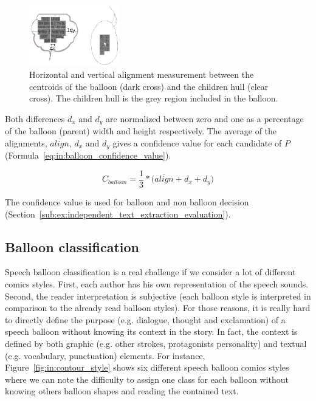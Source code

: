     \begin{figure}[ht]%
      \centering
      \includegraphics[trim= 0px 15px 80px 24px, clip, width=0.35\textwidth]{coaxial_alignment.png}
    \caption[Balloon content alignment measures]{Horizontal and vertical alignment measurement between the centroids of the balloon (dark cross) and the children hull (clear cross). The children hull is the grey region included in the balloon.}
    \label{fig:in:coaxial_alignment}
    \end{figure}

Both differences $d_x$ and $d_y$ are normalized between zero and one as a percentage of the balloon (parent) width and height respectively.
The average of the alignments, $\overline{align}$, $d_x$ and $d_y$ gives a confidence value for each candidate of $P$ (Formula~\ref{eq:in:balloon_confidence_value}).

\begin{equation}
	\label{eq:in:balloon_confidence_value}
	C_{balloon} = \frac{1}{3} * \Big( \overline{align} + d_x + d_y \Big)
\end{equation}

The confidence value is used for balloon and non balloon decision (Section~\ref{sub:ex:independent_text_extraction_evaluation}).



\subsection{Balloon classification} %
\label{sub:in:balloon_classification}

Speech balloon classification is a real challenge if we consider a lot of different comics styles.
First, each author has his own representation of the speech sounds. Second, the reader interpretation is subjective (each balloon style is interpreted in comparison to the already read balloon styles).
For those reasons, it is really hard to directly define the purpose (e.g. dialogue, thought and exclamation) of a speech balloon without knowing its context in the story.
In fact, the context is defined by both graphic (e.g. other strokes, protagonists personality) and textual (e.g. vocabulary, punctuation) elements.
For instance, Figure~\ref{fig:in:contour_style} shows six different speech balloon comics styles where we can note the difficulty to assign one class for each balloon without knowing others balloon shapes and reading the contained text.

